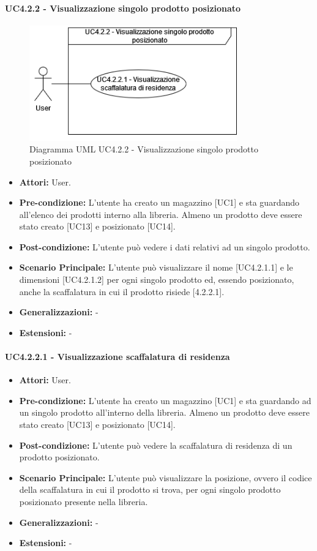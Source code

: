\paragraph{UC4.2.2 - Visualizzazione singolo prodotto posizionato}
\begin{figure}[H]
  \centering
  \includegraphics[width=0.8\textwidth]{UC_diagrams_1-10/UC4.2.2.drawio.png}
   \caption{Diagramma UML UC4.2.2 - Visualizzazione singolo prodotto posizionato}
\end{figure}
\begin{itemize}
    \item \textbf{Attori:} User.
    \item \textbf{Pre-condizione:}  L'utente ha creato un magazzino [UC1] e sta guardando all'elenco dei prodotti interno alla libreria. Almeno un prodotto deve essere stato creato [UC13] e posizionato [UC14].
    \item \textbf{Post-condizione:}  L'utente può vedere i dati relativi ad un singolo prodotto.
    \item \textbf{Scenario Principale:}  L'utente può visualizzare il nome [UC4.2.1.1] e le dimensioni [UC4.2.1.2] per ogni singolo prodotto ed, essendo posizionato, anche la scaffalatura in cui il prodotto risiede [4.2.2.1]. 
    \item \textbf{Generalizzazioni:} -
    \item \textbf{Estensioni:} -
\end{itemize}


\paragraph{UC4.2.2.1 - Visualizzazione scaffalatura di residenza}
\begin{itemize} 
    \item \textbf{Attori:} User.
    \item \textbf{Pre-condizione:}  L'utente ha creato un magazzino [UC1] e sta guardando ad un singolo prodotto all'interno della libreria. Almeno un prodotto deve essere stato creato [UC13] e posizionato [UC14].
    \item \textbf{Post-condizione:} L'utente può vedere la scaffalatura di residenza di un prodotto posizionato.
    \item \textbf{Scenario Principale:} L'utente può visualizzare la posizione, ovvero il codice della scaffalatura in cui il prodotto si trova, per ogni singolo prodotto posizionato presente nella libreria. 
    \item \textbf{Generalizzazioni:} -
    \item \textbf{Estensioni:} -
\end{itemize}